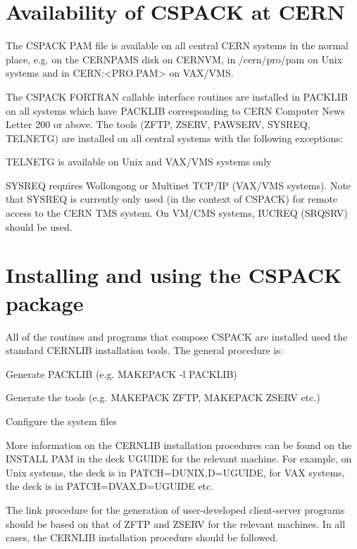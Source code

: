 \chapter{Availability of CSPACK at CERN}
\par
The CSPACK PAM file is available on all central CERN systems
in the normal place, e.g. on the CERNPAMS disk on CERNVM,
in /cern/pro/pam on Unix systems and in CERN:<PRO.PAM> on VAX/VMS.
\par
The CSPACK FORTRAN callable interface routines are installed in PACKLIB
on all systems which have PACKLIB corresponding to CERN Computer
News Letter 200 or above. The tools (ZFTP, ZSERV, PAWSERV, SYSREQ, TELNETG)
are installed on all central systems with the following exceptions:
\begin{OL}
\item
TELNETG is available on Unix and VAX/VMS systems only
\item
SYSREQ requires Wollongong or Multinet TCP/IP (VAX/VMS systems).
Note that SYSREQ is currently only used (in the context of CSPACK)
for remote access to the CERN TMS system.
On VM/CMS systems, IUCREQ (SRQSRV) should be used.
\end{OL}
\chapter{Installing and using the CSPACK package}
\par
All of the routines and programs that compose CSPACK are installed used
the standard CERNLIB installation tools. The general procedure is:
\begin{OL}
\item
Generate PACKLIB (e.g. MAKEPACK -l PACKLIB)
\item
Generate the tools (e.g. MAKEPACK ZFTP, MAKEPACK ZSERV etc.)
\item
Configure the system files
\end{OL}
More information on the CERNLIB installation procedures can be
found on the INSTALL PAM in the deck UGUIDE for the relevant machine.
For example, on Unix systems, the deck is in PATCH=DUNIX,D=UGUIDE,
for VAX systems, the deck is in PATCH=DVAX,D=UGUIDE etc.
\par
The link procedure for the generation of user-developed client-server
programs should be based on that of ZFTP and ZSERV for the relevant
machines. In all cases, the CERNLIB installation procedure
should be followed.

